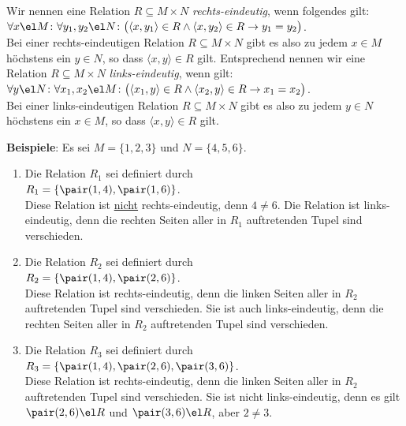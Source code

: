 \begin{Definition}
  Wir nennen eine Relation $R \subseteq M \times N$ 
  \emph{rechts-eindeutig}, wenn folgendes gilt: \\[0.2cm]
  \hspace*{1.3cm} 
  $\forall x \el M \colon \forall y_1, y_2 \el N \colon \bigl(\langle x, y_1 \rangle \in R \wedge \langle x, y_2 \rangle \in R \rightarrow y_1 = y_2\bigr)$.
  \\[0.2cm]
  Bei einer rechts-eindeutigen Relation $R \subseteq M \times N$ gibt es also zu jedem $x\in M$ h\"{o}chstens ein $y \in N$, 
  so dass $\langle x, y \rangle \in R$ gilt.  Entsprechend nennen wir eine Relation $R \subseteq M \times N$ 
  \emph{links-eindeutig}, wenn gilt: \\[0.2cm]
  \hspace*{1.3cm} 
  $\forall y \el N \colon \forall x_1, x_2 \el M \colon \bigl(\langle x_1, y \rangle \in R \wedge \langle x_2, y \rangle \in R \rightarrow x_1 = x_2\bigr)$.
  \\[0.2cm]
  Bei einer links-eindeutigen Relation $R \subseteq M \times N$ 
  gibt es also zu jedem $y\in N$ h\"{o}chstens ein $x \in M$, so
  dass $\langle x, y \rangle \in R$ gilt. \eox
\end{Definition}


\noindent
\textbf{Beispiele}: Es sei $M = \{1,2,3\}$ und $N = \{4,5,6\}$.
\begin{enumerate}
\item Die Relation $R_1$ sei definiert durch \\[0.2cm]
      \hspace*{1.3cm} $R_1 = \{ \pair(1,4), \pair(1,6) \}$. \\[0.2cm]
      Diese Relation ist \underline{nicht} rechts-eindeutig, denn  $4 \not= 6$.
      Die Relation ist links-eindeutig, denn die rechten Seiten aller in $R_1$
      auftretenden Tupel sind verschieden.
\item Die Relation $R_2$ sei definiert durch \\[0.2cm]
      \hspace*{1.3cm} $R_2 = \{ \pair(1,4), \pair(2,6) \}$. \\[0.2cm]
      Diese Relation ist rechts-eindeutig, denn die linken Seiten aller in $R_2$ auftretenden
      Tupel sind verschieden.  Sie ist auch links-eindeutig, denn die rechten Seiten aller
      in $R_2$ auftretenden Tupel sind verschieden. 
\item Die Relation $R_3$ sei definiert durch \\[0.2cm]
      \hspace*{1.3cm} $R_3 = \{ \pair(1,4), \pair(2,6), \pair(3,6) \}$. \\[0.2cm]
      Diese Relation ist rechts-eindeutig, denn die linken Seiten aller in $R_2$       auftretenden
      Tupel sind verschieden.  Sie ist nicht links-eindeutig, denn es gilt
      $\pair(2,6) \el R$ und $\pair(3,6) \el R$, aber $2 \not= 3$.
\end{enumerate}

